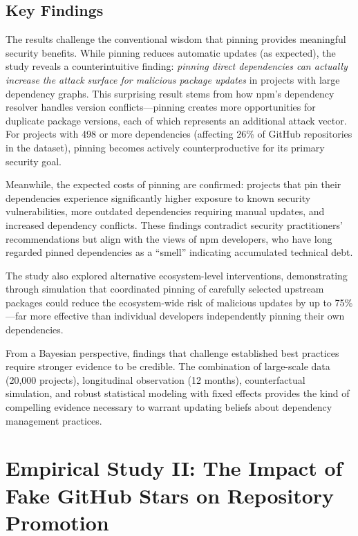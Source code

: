 \subsection{Key Findings}

The results challenge the conventional wisdom that pinning provides meaningful security benefits.
While pinning reduces automatic updates (as expected), the study reveals a counterintuitive finding: \emph{pinning direct dependencies can actually increase the attack surface for malicious package updates} in projects with large dependency graphs.
This surprising result stems from how npm's dependency resolver handles version conflicts---pinning creates more opportunities for duplicate package versions, each of which represents an additional attack vector.
For projects with 498 or more dependencies (affecting 26\% of GitHub repositories in the dataset), pinning becomes actively counterproductive for its primary security goal.

Meanwhile, the expected costs of pinning are confirmed: projects that pin their dependencies experience significantly higher exposure to known security vulnerabilities, more outdated dependencies requiring manual updates, and increased dependency conflicts.
These findings contradict security practitioners' recommendations but align with the views of npm developers, who have long regarded pinned dependencies as a ``smell'' indicating accumulated technical debt.

The study also explored alternative ecosystem-level interventions, demonstrating through simulation that coordinated pinning of carefully selected upstream packages could reduce the ecosystem-wide risk of malicious updates by up to 75\%---far more effective than individual developers independently pinning their own dependencies.

From a Bayesian perspective, findings that challenge established best practices require stronger evidence to be credible.
The combination of large-scale data (20,000 projects), longitudinal observation (12 months), counterfactual simulation, and robust statistical modeling with fixed effects provides the kind of compelling evidence necessary to warrant updating beliefs about dependency management practices.

\section{Empirical Study II: The Impact of Fake GitHub Stars on Repository Promotion}
\label{sec:finished-fake-stars}
\label{chp:fake-stars}

